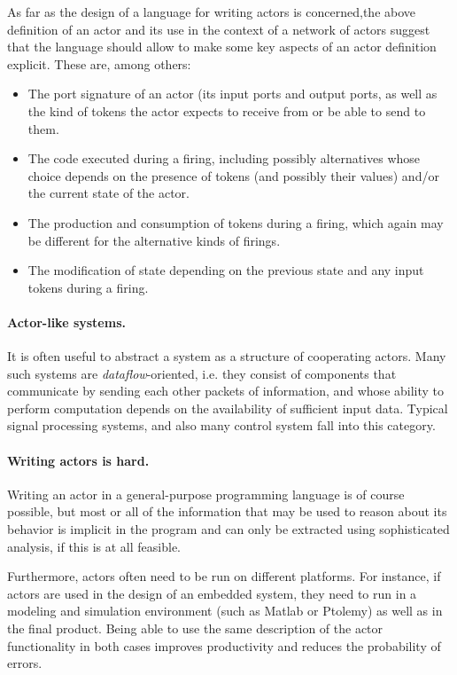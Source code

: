 As far as the design of a language for writing actors is concerned,the
above definition of an actor and its use in the context of a network
of actors suggest that the language should allow to make some key
aspects of an actor definition explicit. These are, among others:
\begin{itemize}
\item The port signature of an actor (its input ports and output
  ports, as well as the kind of tokens the actor expects to receive from or
  be able to send to them.
\item The code executed during a firing, including possibly
  alternatives whose choice depends on the presence of tokens (and
  possibly their values) and/or
  the current state of the actor.
\item The production and consumption of tokens during a firing, which again
  may be different for the alternative kinds of firings.
\item The modification of state depending on the previous state and
  any input tokens during a firing.
\end{itemize}

\paragraph{Actor-like systems.} It is often useful to
abstract a system as a structure of cooperating actors. Many such
systems are {\em dataflow}-oriented, i.e. they consist of components
that communicate by sending each other packets of information, and
whose ability to perform computation depends on the availability of
sufficient input data. Typical signal processing systems, and also many
control system fall into this category.


\paragraph{Writing actors is hard.} Writing an actor in a general-purpose programming language is
of course possible, but most or all of the information that may be
used to reason about its behavior is implicit in the program and can
only be extracted using sophisticated analysis, if this is at all
feasible.

Furthermore, actors often need to be run on different platforms. For
instance, if actors are used in the design of an embedded system, they
need to run in a modeling and simulation environment (such as Matlab
or Ptolemy) as well as in the final product. Being able to use the
same description of the actor functionality in both cases improves
productivity and reduces the probability of errors.


